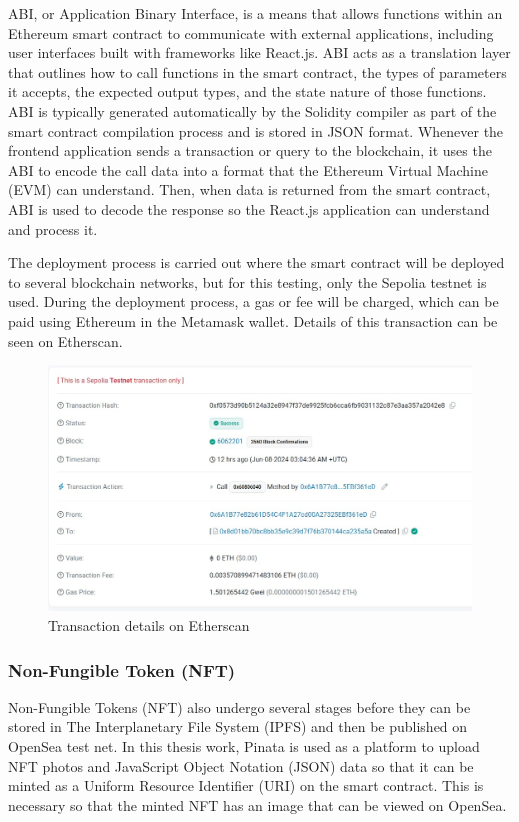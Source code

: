 ABI, or Application Binary Interface, is a means that allows functions within an Ethereum smart contract to communicate with external applications, including user interfaces built with frameworks like React.js. ABI acts as a translation layer that outlines how to call functions in the smart contract, the types of parameters it accepts, the expected output types, and the state nature of those functions. ABI is typically generated automatically by the Solidity compiler as part of the smart contract compilation process and is stored in JSON format. Whenever the frontend application sends a transaction or query to the blockchain, it uses the ABI to encode the call data into a format that the Ethereum Virtual Machine (EVM) can understand. Then, when data is returned from the smart contract, ABI is used to decode the response so the React.js application can understand and process it.

The deployment process is carried out where the smart contract will be deployed to several blockchain networks, but for this testing, only the Sepolia testnet is used. During the deployment process, a gas or fee will be charged, which can be paid using Ethereum in the Metamask wallet. Details of this transaction can be seen on Etherscan.

\begin{figure} [H] \centering
  \includegraphics[scale=0.24]{gambar/etherscan.jpeg}
  \caption{Transaction details on Etherscan}
  \label{fig:transaction}
\end{figure}

\subsubsection{Non-Fungible Token (NFT)}
Non-Fungible Tokens (NFT) also undergo several stages before they can be stored in The Interplanetary File System (IPFS) and then be published on OpenSea test net. In this thesis work, Pinata is used as a platform to upload NFT photos and JavaScript Object Notation (JSON) data so that it can be minted as a Uniform Resource Identifier (URI) on the smart contract. This is necessary so that the minted NFT has an image that can be viewed on OpenSea.

